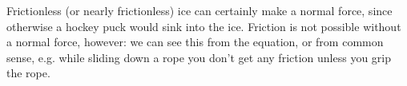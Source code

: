 Frictionless (or nearly frictionless) ice can certainly make
a normal force, since otherwise a hockey puck would sink into the ice. Friction
is not possible without a normal force, however: we can see this from the equation,
or from common sense, e.g. while sliding down a rope you don't get any friction
unless you grip the rope.
